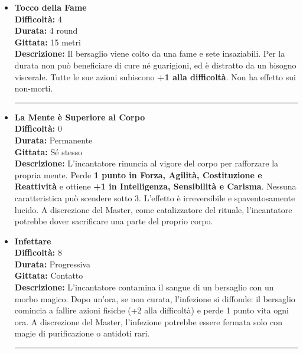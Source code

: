 \documentclass[./magie.tex]{subfiles}
\begin{document}
\begin{itemize}
\vspace{0.5cm}\rule{\textwidth}{0.4pt}\vspace{1cm}

\item \textbf{Tocco della Fame} \\
\textbf{Difficoltà:} 4 \\
\textbf{Durata:} 4 round \\
\textbf{Gittata:} 15 metri \\
\textbf{Descrizione:} Il bersaglio viene colto da una fame e sete insaziabili. Per la durata non può beneficiare di cure né guarigioni, ed è distratto da un bisogno viscerale. Tutte le sue azioni subiscono \textbf{+1 alla difficoltà}. Non ha effetto sui non-morti.

\vspace{0.5cm}\rule{\textwidth}{0.4pt}\vspace{1cm}
\item \textbf{La Mente è Superiore al Corpo} \\
\textbf{Difficoltà:} 0 \\
\textbf{Durata:} Permanente \\
\textbf{Gittata:} Sé stesso \\
\textbf{Descrizione:} L'incantatore rinuncia al vigore del corpo per rafforzare la propria mente. Perde \textbf{1 punto in Forza, Agilità, Costituzione e Reattività} e ottiene \textbf{+1 in Intelligenza, Sensibilità e Carisma}. Nessuna caratteristica può scendere sotto 3. L’effetto è irreversibile e spaventosamente lucido. A discrezione del Master, come catalizzatore del rituale, l'incantatore potrebbe dover sacrificare una parte del proprio corpo.

\item \textbf{Infettare} \\
\textbf{Difficoltà:} 8 \\
\textbf{Durata:} Progressiva \\
\textbf{Gittata:} Contatto \\
\textbf{Descrizione:} L'incantatore contamina il sangue di un bersaglio con un morbo magico. Dopo un’ora, se non curata, l’infezione si diffonde: il bersaglio comincia a fallire azioni fisiche (+2 alla difficoltà) e perde 1 punto vita ogni ora. A discrezione del Master, l'infezione potrebbe essere fermata solo con magie di purificazione o antidoti rari.

\vspace{0.5cm}\rule{\textwidth}{0.4pt}\vspace{1cm}

\end{itemize}
\end{document}
